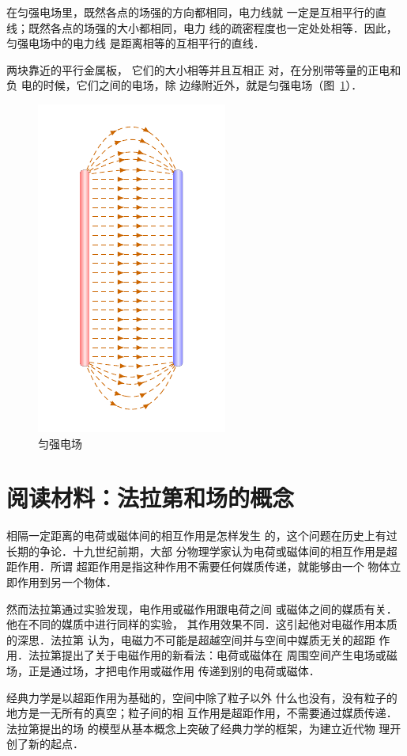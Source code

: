 在匀强电场里，既然各点的场强的方向都相同，电力线就
一定是互相平行的直线；既然各点的场强的大小都相同，电力
线的疏密程度也一定处处相等．因此，匀强电场中的电力线
是距离相等的互相平行的直线．

两块靠近的平行金属板，
它们的大小相等并且互相正
对，在分别带等量的正电和负
电的时候，它们之间的电场，除
边缘附近外，就是匀强电场（图~\ref{fig_B_6-11}）．

\begin{figure}[htbp]
    \centering
    \includegraphics{fig/B/6-11.pdf}
    \caption{匀强电场}\label{fig_B_6-11}
\end{figure}

\section*{阅读材料：法拉第和场的概念}
相隔一定距离的电荷或磁体间的相互作用是怎样发生
的，这个问题在历史上有过长期的争论．十九世纪前期，大部
分物理学家认为电荷或磁体间的相互作用是超距作用．所谓
超距作用是指这种作用不需要任何媒质传递，就能够由一个
物体立即作用到另一个物体．

然而法拉第通过实验发现，电作用或磁作用跟电荷之间
或磁体之间的媒质有关．他在不同的媒质中进行同样的实验，
其作用效果不同．这引起他对电磁作用本质的深思．法拉第
认为，电磁力不可能是超越空间并与空间中媒质无关的超距
作用．法拉第提出了关于电磁作用的新看法：电荷或磁体在
周围空间产生电场或磁场，正是通过场，才把电作用或磁作用
传递到别的电荷或磁体．

经典力学是以超距作用为基础的，空间中除了粒子以外
什么也没有，没有粒子的地方是一无所有的真空；粒子间的相
互作用是超距作用，不需要通过媒质传递．法拉第提出的场
的模型从基本概念上突破了经典力学的框架，为建立近代物
理开创了新的起点．

